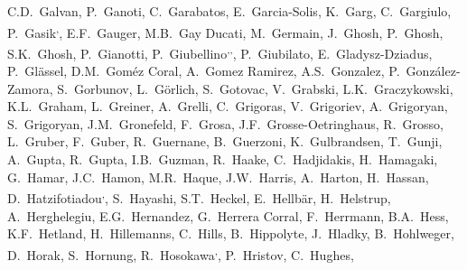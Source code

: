\begin{flushleft}
C.D.~Galvan\And, 
P.~Ganoti\And, 
C.~Garabatos\And, 
E.~Garcia-Solis\And, 
K.~Garg\And, 
C.~Gargiulo\And, 
P.~Gasik\textsuperscript{,}\And, 
E.F.~Gauger\And, 
M.B.~Gay Ducati\And, 
M.~Germain\And, 
J.~Ghosh\And, 
P.~Ghosh\And, 
S.K.~Ghosh\And, 
P.~Gianotti\And, 
P.~Giubellino\textsuperscript{,}\textsuperscript{,}\And, 
P.~Giubilato\And, 
E.~Gladysz-Dziadus\And, 
P.~Gl\"{a}ssel\And, 
D.M.~Gom\'{e}z Coral\And, 
A.~Gomez Ramirez\And, 
A.S.~Gonzalez\And, 
P.~Gonz\'{a}lez-Zamora\And, 
S.~Gorbunov\And, 
L.~G\"{o}rlich\And, 
S.~Gotovac\And, 
V.~Grabski\And, 
L.K.~Graczykowski\And, 
K.L.~Graham\And, 
L.~Greiner\And, 
A.~Grelli\And, 
C.~Grigoras\And, 
V.~Grigoriev\And, 
A.~Grigoryan\And, 
S.~Grigoryan\And, 
J.M.~Gronefeld\And, 
F.~Grosa\And, 
J.F.~Grosse-Oetringhaus\And, 
R.~Grosso\And, 
L.~Gruber\And, 
F.~Guber\And, 
R.~Guernane\And, 
B.~Guerzoni\And, 
K.~Gulbrandsen\And, 
T.~Gunji\And, 
A.~Gupta\And, 
R.~Gupta\And, 
I.B.~Guzman\And, 
R.~Haake\And, 
C.~Hadjidakis\And, 
H.~Hamagaki\And, 
G.~Hamar\And, 
J.C.~Hamon\And, 
M.R.~Haque\And, 
J.W.~Harris\And, 
A.~Harton\And, 
H.~Hassan\And, 
D.~Hatzifotiadou\textsuperscript{,}\And, 
S.~Hayashi\And, 
S.T.~Heckel\And, 
E.~Hellb\"{a}r\And, 
H.~Helstrup\And, 
A.~Herghelegiu\And, 
E.G.~Hernandez\And, 
G.~Herrera Corral\And, 
F.~Herrmann\And, 
B.A.~Hess\And, 
K.F.~Hetland\And, 
H.~Hillemanns\And, 
C.~Hills\And, 
B.~Hippolyte\And, 
J.~Hladky\And, 
B.~Hohlweger\And, 
D.~Horak\And, 
S.~Hornung\And, 
R.~Hosokawa\textsuperscript{,}\And, 
P.~Hristov\And, 
C.~Hughes\And, 

\end{flushleft}
